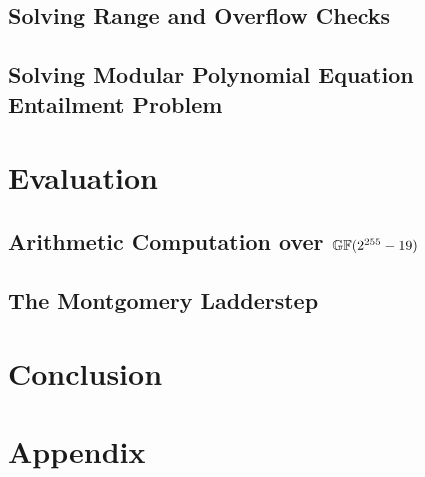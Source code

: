 \documentclass[sigconf, anonymous]{acmart}
\begin{document}
\subsection{Solving Range and Overflow Checks}
\label{subsection:solving-range-overflow-checks}


\subsection{Solving Modular Polynomial Equation Entailment Problem}
\label{subsection:solving-algebraic-equations}



\section{Evaluation}
\label{section:evaluation}


\subsection{Arithmetic Computation over $\mathbb{GF}(2^{255}-19)$}
\label{subection:evaluation:multiplication}


\subsection{The Montgomery Ladderstep}
\label{subsection:evaluation:ladder-step}



\section{Conclusion}
\label{section:conclusion}


\newpage

%



\appendix
\section{Appendix}
\label{section:appendix}


\end{document}
